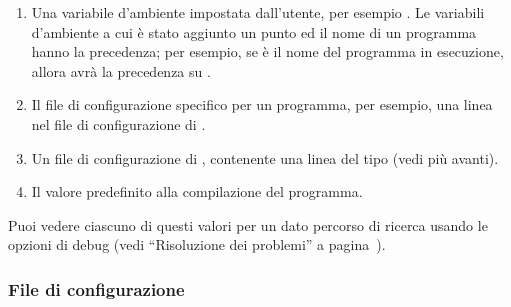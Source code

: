 \documentclass{article}
\begin{document}
\begin{enumerate}
\item
  Una variabile d'ambiente impostata dall'utente, per esempio
  \@. Le variabili d'ambiente a cui è stato aggiunto un
  punto ed il nome di un programma hanno la precedenza; per esempio, se
   è il nome del programma in esecuzione, allora
   avrà la precedenza su .
\item
  Il file di configurazione specifico per un programma, per esempio, una
  linea  nel file di configurazione  di
  .
\item
  Un file di configurazione  di \KPS, contenente una linea
  del tipo  (vedi più avanti).
\item Il valore predefinito alla compilazione del programma.
\end{enumerate}
\noindent Puoi vedere ciascuno di questi valori per un dato percorso di
ricerca usando le opzioni di debug (vedi ``Risoluzione dei problemi'' a
pagina~\pageref{sec:debugging}).

\subsubsection{File di configurazione}
\end{document}

